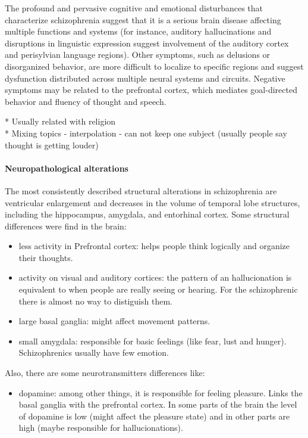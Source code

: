 \documentclass[12pt,article,oneside,a4paper]{memoir}
\begin{document}
The profound and pervasive cognitive and emotional disturbances that
characterize schizophrenia suggest that it is a serious brain disease affecting
multiple functions and systems (for instance, auditory hallucinations and
disruptions in linguistic expression suggest involvement of the auditory cortex
and perisylvian language regions). Other symptoms, such as delusions or
disorganized behavior, are more difficult to localize to specific regions and
suggest dysfunction distributed across multiple neural systems and circuits.
Negative symptoms may be related to the prefrontal cortex, which mediates
goal-directed behavior and fluency of thought and speech.

* Usually related with religion \\
* Mixing topics - interpolation - can not keep one subject (usually people say
thought is getting louder)\\

\paragraph{Neuropathological alterations}
The most consistently described structural alterations in schizophrenia are
ventricular enlargement and decreases in the volume of temporal lobe
structures, including the hippocampus, amygdala, and entorhinal cortex.
Some structural differences were find in the brain:
\begin{itemize}
\item less activity in Prefrontal cortex: helps people think logically and
organize their thoughts.
\item activity on visual and auditory cortices: the pattern of an
hallucionation is equivalent to when people are really seeing or hearing. For 
the schizophrenic there is almost no way to distiguish them.
\item large basal ganglia: might affect movement patterns.
\item small amygdala: responsible for basic feelings (like fear, lust and
hunger). Schizophrenics usually have few emotion.
\end{itemize}

Also, there are some neurotransmitters differences like:
\begin{itemize}
\item dopamine: among other things, it is responsible for feeling pleasure.
Links the basal ganglia with the prefrontal cortex. In some parts of the brain
the level of dopamine is low (might affect the pleasure state) and in other
parts are high (maybe responsible for hallucionations).
\end{itemize}
\end{document}
